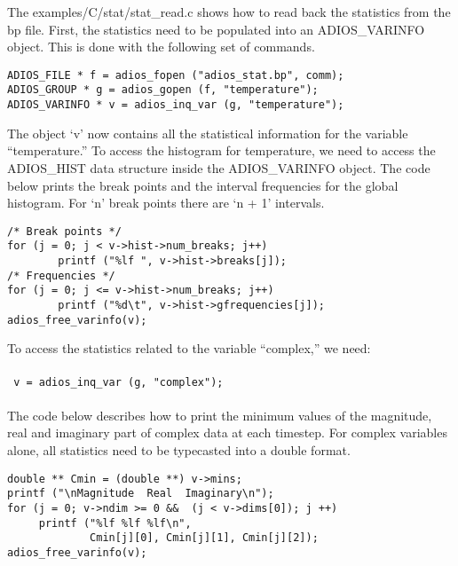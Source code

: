 The examples/C/stat/stat\_read.c shows how to read back the statistics from the 
bp file. First, the statistics need to be populated into an ADIOS\_VARINFO object. 
This is done with the following set of commands.

\begin{lstlisting}[alsolanguage=C]
ADIOS_FILE * f = adios_fopen ("adios_stat.bp", comm);
ADIOS_GROUP * g = adios_gopen (f, "temperature");
ADIOS_VARINFO * v = adios_inq_var (g, "temperature");
\end{lstlisting}

The object `v' now contains all the statistical information for the variable ``temperature.'' 
To access the histogram for temperature, we need to access the ADIOS\_HIST data 
structure inside the ADIOS\_VARINFO object. The code below prints the break points 
and the interval frequencies for the global histogram. For `n' break points there 
are `n + 1' intervals.

\begin{lstlisting}
/* Break points */
for (j = 0; j < v->hist->num_breaks; j++)
        printf ("%lf ", v->hist->breaks[j]);
/* Frequencies */
for (j = 0; j <= v->hist->num_breaks; j++)
        printf ("%d\t", v->hist->gfrequencies[j]);
adios_free_varinfo(v);
\end{lstlisting}

To access the statistics related to the variable ``complex,'' we need:
\\
\\
\texttt{
v = adios\_inq\_var (g, \texttt{"}complex\texttt{"});
}
\\
\\
The code below describes how to print the minimum values of the magnitude, real 
and imaginary part of complex data at each timestep. For complex variables alone, 
all statistics need to be typecasted into a double format.

\begin{lstlisting}[alsolanguage=C]
double ** Cmin = (double **) v->mins;
printf ("\nMagnitude  Real  Imaginary\n");
for (j = 0; v->ndim >= 0 &&  (j < v->dims[0]); j ++) 
     printf ("%lf %lf %lf\n", 
             Cmin[j][0], Cmin[j][1], Cmin[j][2]);
adios_free_varinfo(v);
\end{lstlisting}

